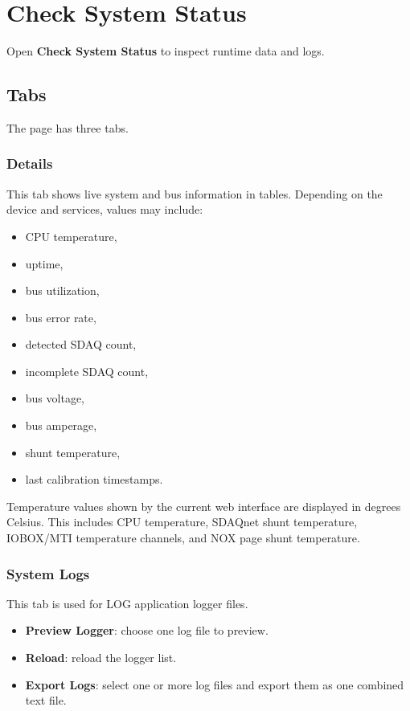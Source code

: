 \documentclass[11pt,a4paper]{article}
\begin{document}
\section{Check System Status}
Open \textbf{Check System Status} to inspect runtime data and logs.

\subsection{Tabs}
The page has three tabs.

\subsubsection{Details}
This tab shows live system and bus information in tables. Depending on the device and services, values may include:

\begin{itemize}
\item CPU temperature,
\item uptime,
\item bus utilization,
\item bus error rate,
\item detected SDAQ count,
\item incomplete SDAQ count,
\item bus voltage,
\item bus amperage,
\item shunt temperature,
\item last calibration timestamps.
\end{itemize}

Temperature values shown by the current web interface are displayed in degrees Celsius. This includes CPU temperature, SDAQnet shunt temperature, IOBOX/MTI temperature channels, and NOX page shunt temperature.

\subsubsection{System Logs}
This tab is used for LOG application logger files.

\begin{itemize}
\item \textbf{Preview Logger}: choose one log file to preview.
\item \textbf{Reload}: reload the logger list.
\item \textbf{Export Logs}: select one or more log files and export them as one combined text file.
\end{itemize}
\end{document}
